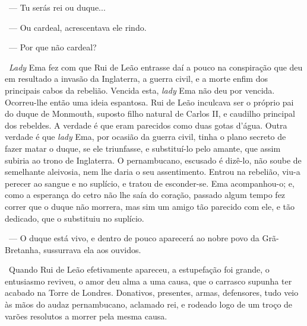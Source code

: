 ~--- Tu serás rei ou duque...

~--- Ou cardeal, acrescentava ele rindo.

~--- Por que não cardeal?

~\emph{Lady} Ema fez com que Rui de Leão entrasse daí a pouco na
conspiração que deu em resultado a invasão da Inglaterra, a guerra
civil, e a morte enfim dos principais cabos da rebelião. Vencida esta,
\emph{lady} Ema não deu por vencida. Ocorreu-lhe então uma ideia
espantosa. Rui de Leão inculcava ser o próprio pai do duque de Monmouth,
suposto filho natural de Carlos II, e caudilho principal dos rebeldes. A
verdade é que eram parecidos como duas gotas d'água. Outra verdade é que
\emph{lady} Ema, por ocasião da guerra civil, tinha o plano secreto de
fazer matar o duque, se ele triunfasse, e substituí-lo pelo amante, que
assim subiria ao trono de Inglaterra. O pernambucano, escusado é
dizê-lo, não soube de semelhante aleivosia, nem lhe daria o seu
assentimento. Entrou na rebelião, viu-a perecer ao sangue e no suplício,
e tratou de esconder-se. Ema acompanhou-o; e, como a esperança do cetro
não lhe saía do coração, passado algum tempo fez correr que o duque não
morrera, mas sim um amigo tão parecido com ele, e tão dedicado, que o
substituiu no suplício.

~--- O duque está vivo, e dentro de pouco aparecerá ao nobre povo da
Grã-Bretanha, sussurrava ela aos ouvidos.

~Quando Rui de Leão efetivamente apareceu, a estupefação foi grande, o
entusiasmo reviveu, o amor deu alma a uma causa, que o carrasco supunha
ter acabado na Torre de Londres. Donativos, presentes, armas,
defensores, tudo veio às mãos do audaz pernambucano, aclamado rei, e
rodeado logo de um troço de varões resolutos a morrer pela mesma causa.

